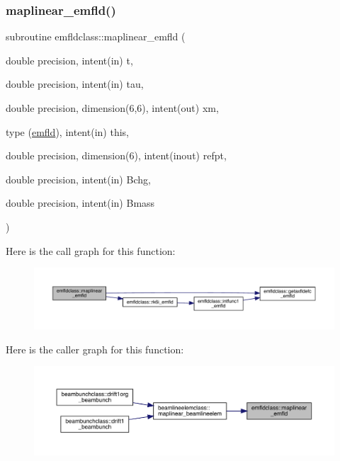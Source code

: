 \subsubsection{\texorpdfstring{maplinear\_emfld()}{maplinear\_emfld()}}
{\footnotesize\ttfamily subroutine emfldclass\+::maplinear\+\_\+emfld (\begin{DoxyParamCaption}\item[{double precision, intent(in)}]{t,  }\item[{double precision, intent(in)}]{tau,  }\item[{double precision, dimension(6,6), intent(out)}]{xm,  }\item[{type (\mbox{\hyperlink{namespaceemfldclass_structemfldclass_1_1emfld}{emfld}}), intent(in)}]{this,  }\item[{double precision, dimension(6), intent(inout)}]{refpt,  }\item[{double precision, intent(in)}]{Bchg,  }\item[{double precision, intent(in)}]{Bmass }\end{DoxyParamCaption})}

Here is the call graph for this function\+:\nopagebreak
\begin{figure}[H]
\begin{center}
\leavevmode
\includegraphics[width=350pt]{namespaceemfldclass_ab283b339abd3df592d8200c244652131_cgraph}
\end{center}
\end{figure}
Here is the caller graph for this function\+:\nopagebreak
\begin{figure}[H]
\begin{center}
\leavevmode
\includegraphics[width=350pt]{namespaceemfldclass_ab283b339abd3df592d8200c244652131_icgraph}
\end{center}
\end{figure}
\mbox{\label{namespaceemfldclass_ae4bfa1325df7cec4a3facbe8ebc66845}} 
